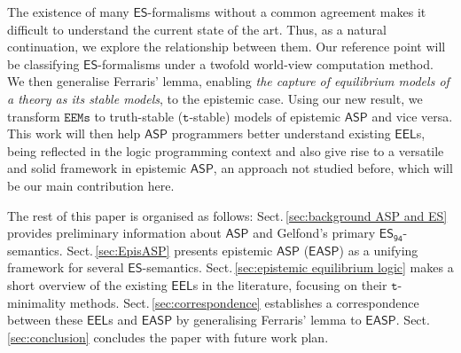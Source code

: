 \documentclass[submission,copyright,creativecommons]{eptcs}
\newcommand{\logic}[1]  { \ensuremath{\mathsf{#1}} }
\newcommand{\ASP}  { \logic{ASP} }
\newcommand{\ES}  { \logic{ES} }
\newcommand{\EASP}  { \logic{EASP} }
\newcommand{\EEL}  { \logic{EEL} }
\newcommand{\ESdoksandort}  { \logic{ES_{\scriptscriptstyle{94}} } }
\newcommand{\EEMs}  { \texttt{EEMs} }
\begin{document}
The existence of many $\ES$-formalisms without a common agreement makes it difficult
to understand the current state of the art. Thus, as a natural continuation, we explore the relationship between them.
Our reference point will be classifying $\ES$-formalisms 
under a twofold world-view computation method. We then generalise Ferraris' lemma, enabling
\emph{the capture of equilibrium models of a theory as its stable models}, to the epistemic case. Using our new result, we transform $\EEMs$ to truth-stable ($\texttt{t}$-stable) models of epistemic $\ASP$ and vice versa. This work will then help $\ASP$ programmers
better understand existing $\EEL$s, being reflected in the 
logic programming context and also give rise to a versatile and solid framework
in epistemic $\ASP$, an approach not studied before, which will be 
our main contribution here. 
 
The rest of this paper is organised as follows:
Sect.\,\ref{sec:background ASP and ES} 
provides preliminary information about $\ASP$ and Gelfond's primary
$\ESdoksandort$-semantics.
%
Sect.\,\ref{sec:EpisASP} presents epistemic $\ASP$ ($\EASP$) as a unifying 
framework for several $\ES$-semantics.
%
Sect.\,\ref{sec:epistemic equilibrium logic} makes a short overview of the existing 
$\EEL$s in the literature, focusing on their $\texttt{t}$-minimality methods.
%
Sect.\,\ref{sec:correspondence} establishes a correspondence
between these $\EEL$s and $\EASP$ by generalising Ferraris' lemma to $\EASP$.
%
Sect.\,\ref{sec:conclusion} concludes the paper with
future work plan.

\end{document}
